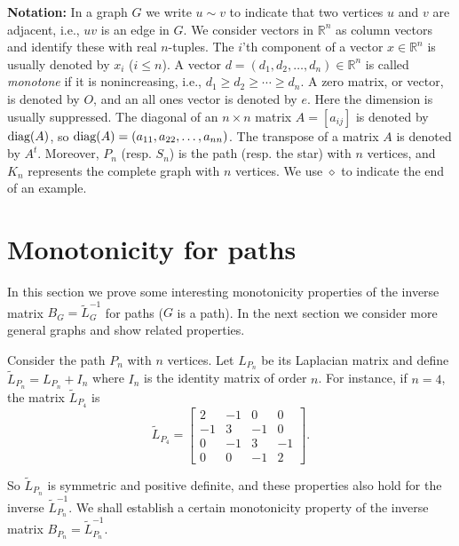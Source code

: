 \documentclass[12pt]{article}
\newcommand{\diag}{\mbox{\rm diag}}
\newcommand{\mb}{\mathbb}
\begin{document}
\smallskip
{\bf Notation:} In a graph $G$ we write  $u \sim v$ to indicate that two vertices $u$ and $v$ are adjacent, i.e., $uv$ is an edge in $G$. We consider vectors in $\mb{R}^n$ as column vectors and identify these with  real $n$-tuples. The $i$'th component of a vector $x \in \mb{R}^n$ is usually denoted by $x_i$ ($ i \le n$). A vector $d=(d_1, d_2, \ldots, d_n) \in \mb{R}^n$ is called {\em monotone} if it is nonincreasing, i.e., $d_1 \ge  d_2 \ge  \cdots \ge  d_n$. 
A zero matrix, or vector, is denoted by $O$, and an all ones vector is denoted by $e$. Here the dimension is usually suppressed. The diagonal of an $n \times n$  matrix $A=[a_{ij}]$ is denoted by $\diag(A)$, so $\diag(A)=(a_{11}, a_{22}, \ldots, a_{nn})$. The transpose of a matrix $A$ is denoted by $A^t$. 
 Moreover, $P_n$ (resp. $S_n$) is the path (resp. the star) with $n$ vertices, and $K_n$ represents the complete graph with $n$ vertices. We use $\diamond$ to indicate the end of an example. 




\section{Monotonicity for paths}
 \label{se:mono}

In this section we prove some interesting monotonicity properties of the inverse matrix $B_G=\tilde{L}_{G}^{-1}$ for paths ($G$ is a path). In the next section we consider more general graphs and show related properties. 


Consider the path $P_n$ with $n$ vertices. Let $L_{P_n}$ be its Laplacian matrix and define $\tilde{L}_{P_n}=L_{P_n}+I_n$ where $I_n$ is the identity matrix of order $n$. 
For instance, if $n=4$, the matrix $\tilde{L}_{P_4}$ is
%
\[
\tilde{L}_{P_4}=
\left[
\begin{array}{rrrr}
   2 & -1 & 0 & 0 \\
    -1&  3 & -1 & 0  \\
    0 & -1&  3 & -1   \\
   0 & 0 & -1&  2 
\end{array}
\right].
\]

So $\tilde{L}_{P_n}$ is symmetric and positive definite, and these properties also hold for the inverse $\tilde{L}_{P_n}^{-1}$. We shall establish a certain monotonicity property of the inverse matrix 
$B_{P_n}=\tilde{L}_{P_n}^{-1}$.
\end{document}
